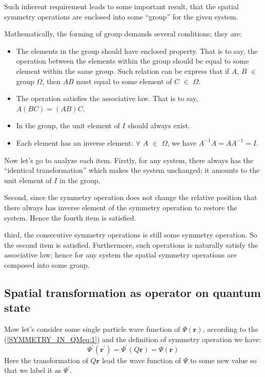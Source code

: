 Such inherent requirement leads to some important result, that the
spatial symmetry operations are enclosed into some ``group'' for the
given system.

Mathematically, the forming of group demands several conditions;
they are:
\begin{itemize}
  \item The elements in the group should have enclosed property.
  That is to say, the operation between the elements within the
  group should be equal to some element within the same group. Such
  relation can be express that if $A$, $B$ $\in$ group $\Omega$,
  then $AB$ must equal to some element of $C$ $\in$ $\Omega$.
  \item The operation satisfies the associative law. That is to say,
  $A(BC) = (AB)C$.
  \item In the group, the unit element of $I$ should always exist.
  \item Each element has an inverse element: $\forall$ $A$
  $\in$ $\Omega$, we have $A^{-1}A = AA^{-1} = I$.
\end{itemize}

Now let's go to analyze each item. Firstly, for any system, there
always has the ``identical transformation'' which makes the system
unchanged; it amounts to the unit element of $I$ in the group.

Second, since the symmetry operation does not change the relative
position that there always has inverse element of the symmetry
operation to restore the system. Hence the fourth item is satisfied.

third, the consecutive symmetry operations is still some symmetry
operation. So the second item is satisfied. Furthermore, such
operations is naturally satisfy the associative law; hence for any
system the spatial symmetry operations are composed into some group.


\subsection{Spatial transformation as operator on quantum state}
%
%
Mow let's consider some single particle wave function of
$\Psi(\bm{r})$, according to the (\ref{SYMMETRY_IN_QMeq:1}) and the
definition of symmetry operation we have:
\begin{equation}\label{}
\Psi^{'}(\bm{r^{'}}) = \Psi^{'}(Q\bm{r}) = \Psi(\bm{r})
\end{equation}
Here the transformation of $Q\bm{r}$ lead the wave function of
$\Psi$ to some new value so that we label it as $\Psi^{'}$.

